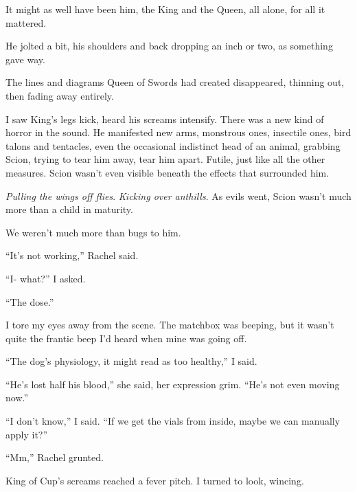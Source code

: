 It might as well have been him, the King and the Queen, all alone, for all it mattered.



He jolted a bit, his shoulders and back dropping an inch or two, as something gave way.



The lines and diagrams Queen of Swords had created disappeared, thinning out, then fading away entirely.



I saw King's legs kick, heard his screams intensify.  There was a new kind of horror in the sound.  He manifested new arms, monstrous ones, insectile ones, bird talons and tentacles, even the occasional indistinct head of an animal, grabbing Scion, trying to tear him away, tear him apart.  Futile, just like all the other measures.  Scion wasn't even visible beneath the effects that surrounded him.



\emph{Pulling the wings off flies}.  \emph{Kicking over anthills}.  As evils went, Scion wasn't much more than a child in maturity.



We weren't much more than bugs to him.



``It's not working,'' Rachel said.



``I- what?'' I asked.



``The dose.''



I tore my eyes away from the scene.  The matchbox was beeping, but it wasn't quite the frantic beep I'd heard when mine was going off.



``The dog's physiology, it might read as too healthy,'' I said.



``He's lost half his blood,'' she said, her expression grim.  ``He's not even moving now.''



``I don't know,'' I said.  ``If we get the vials from inside, maybe we can manually apply it?''



``Mm,'' Rachel grunted.



King of Cup's screams reached a fever pitch.  I turned to look, wincing.



